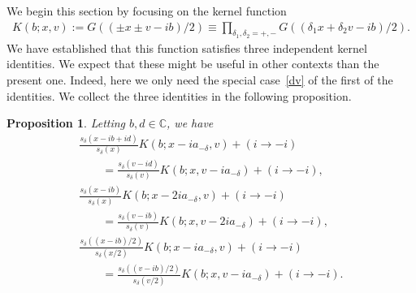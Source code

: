 \documentclass[11pt]{article}
\numberwithin{equation}{section}
\newcommand{\de}{\delta}
\newcommand{\C}{{\mathbb C}}
\newtheorem{prop}[lem]{Proposition}
\begin{document}
We begin this section by focusing on the kernel function
\begin{gather}
K(b;x,v):=G((\pm x \pm v -ib)/2)\equiv\prod_{\de_1,\de_2=+,-}G((\de_1 x+\de_2 v-ib)/2).
\end{gather}
We have established that this function satisf\/ies three independent kernel identities. We expect that these might be useful in other contexts than the present one. Indeed, here we only need the special case~\eqref{dv} of the f\/irst of the identities. We  collect the three identities in the following proposition.

\begin{prop}\label{proposition3.1}
Letting $b,d\in\C$, we have
\begin{gather}
\frac{s_{\de}(x-ib+id)}{s_{\de}(x)}K(b;x-ia_{-\de},v)+(i\to -i)\nonumber\\
\qquad{} =\frac{s_{\de}(v-id)}{s_{\de}(v)}K(b;x,v-ia_{-\de})+(i\to -i),\label{idd}
\\
\frac{s_{\de}(x-ib)}{s_{\de}(x)}K(b;x-2ia_{-\de},v)+(i\to -i)\nonumber\\
\qquad{}=
\frac{s_{\de}(v-ib)}{s_{\de}(v)}K(b;x,v-2ia_{-\de})+(i\to -i),\label{id2}
\\
\frac{s_{\de}((x-ib)/2)}{s_{\de}(x/2)}K(b;x-ia_{-\de},v)+(i\to -i)\nonumber\\
\qquad{} =
\frac{s_{\de}((v-ib)/2)}{s_{\de}(v/2)}K(b;x,v-ia_{-\de})+(i\to -i).\label{id3}
\end{gather}
\end{prop}
\end{document}
